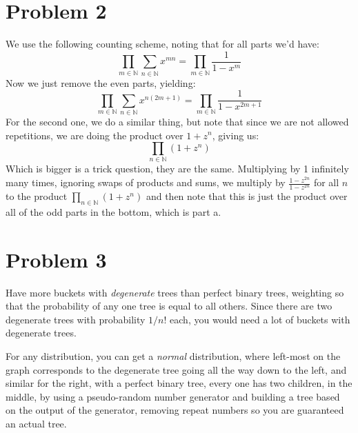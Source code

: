\documentclass{article}
\begin{document}
    \section*{Problem 2}
        We use the following counting scheme, noting that for all parts we'd have:
        \begin{equation}
            \prod_{m\in\mathbb{N}}\sum_{n\in\mathbb{N}}x^{mn}
            =\prod_{m\in\mathbb{N}}\frac{1}{1-x^{m}}
        \end{equation}
        Now we just remove the even parts, yielding:
        \begin{equation}
            \prod_{m\in\mathbb{N}}\sum_{n\in\mathbb{N}}x^{n(2m+1)}
            =\prod_{m\in\mathbb{N}}\frac{1}{1-x^{2m+1}}
        \end{equation}
        For the second one, we do a similar thing, but note that since we are not allowed
        repetitions, we are doing the product over $1+z^{n}$, giving us:
        \begin{equation}
            \prod_{n\in\mathbb{N}}(1+z^{n})
        \end{equation}
        Which is bigger is a trick question, they are the same. Multiplying by 1
        infinitely many times, ignoring swaps of products and sums, we multiply by
        $\frac{1-z^{2n}}{1-z^{2n}}$ for all $n$ to the product
        $\prod_{n\in\mathbb{N}}(1+z^{n})$ and then note that this is just the product
        over all of the odd parts in the bottom, which is part a.
    \section*{Problem 3}
        Have more buckets with \textit{degenerate} trees than perfect binary trees,
        weighting so that the probability of any one tree is equal to all others. Since
        there are two degenerate trees with probability $1/n!$ each, you would need a lot
        of buckets with degenerate trees.
        \par\hfill\par\noindent
        For any distribution, you can get a \textit{normal} distribution, where left-most
        on the graph corresponds to the degenerate tree going all the way down to the
        left, and similar for the right, with a perfect binary tree, every one has two
        children, in the middle, by using a pseudo-random number generator and building
        a tree based on the output of the generator, removing repeat numbers so you are
        guaranteed an actual tree.
\end{document}
